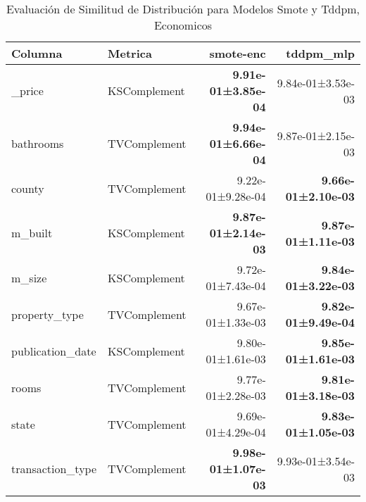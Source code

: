 \begin{table}[H]
\centering
\caption{Evaluación de Similitud de Distribución para Modelos Smote y Tddpm, Economicos}
\label{table-shape-economicos-a}
\begin{tabular}{|l|l|r|r|}
\hline
\rowcolor[gray]{0.8}
Columna & Metrica & smote-enc & tddpm\_mlp \\
\hline \_price & KSComplement & \bfseries 9.91e-01±3.85e-04 & 9.84e-01±3.53e-03 \\
\hline bathrooms & TVComplement & \bfseries 9.94e-01±6.66e-04 & 9.87e-01±2.15e-03 \\
\hline county & TVComplement & \cellcolor[rgb]{0.9, 0.54, 0.52} 9.22e-01±9.28e-04 & \bfseries \cellcolor[rgb]{0.9, 0.54, 0.52} 9.66e-01±2.10e-03 \\
\hline m\_built & KSComplement & \bfseries 9.87e-01±2.14e-03 & \bfseries 9.87e-01±1.11e-03 \\
\hline m\_size & KSComplement & 9.72e-01±7.43e-04 & \bfseries 9.84e-01±3.22e-03 \\
\hline property\_type & TVComplement & 9.67e-01±1.33e-03 & \bfseries 9.82e-01±9.49e-04 \\
\hline publication\_date & KSComplement & 9.80e-01±1.61e-03 & \bfseries 9.85e-01±1.61e-03 \\
\hline rooms & TVComplement & 9.77e-01±2.28e-03 & \bfseries 9.81e-01±3.18e-03 \\
\hline state & TVComplement & 9.69e-01±4.29e-04 & \bfseries 9.83e-01±1.05e-03 \\
\hline transaction\_type & TVComplement & \bfseries 9.98e-01±1.07e-03 & 9.93e-01±3.54e-03 \\
\hline
\end{tabular}
\end{table}
